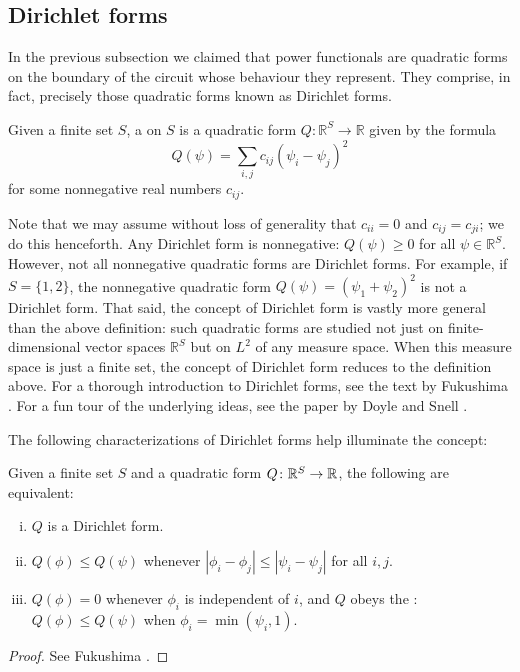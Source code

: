 \subsection{Dirichlet forms}

In the previous subsection we claimed that power functionals are quadratic forms
on the boundary of the circuit whose behaviour they represent. They comprise, in
fact, precisely those quadratic forms known as Dirichlet forms.

\begin{definition}
Given a finite set $S$, a  on $S$ is a quadratic form $Q:
\mathbb{R}^S \to \mathbb{R}$ given by the formula
\[
  Q(\psi) = \sum_{i,j} c_{i j} (\psi_i - \psi_j)^2
\]
for some nonnegative real numbers $c_{i j}$.  
\end{definition}

Note that we may assume without loss of generality that $c_{i i} = 0$ and $c_{i
j} = c_{j i}$; we do this henceforth.  Any Dirichlet form is nonnegative:
$Q(\psi) \ge 0$ for all $\psi \in \mathbb{R}^S$.  However, not all nonnegative
quadratic forms are Dirichlet forms.  For example, if $S = \{1, 2\}$, the
nonnegative quadratic form $Q(\psi) = (\psi_1 + \psi_2)^2$ is not a Dirichlet
form. That said, the concept of Dirichlet form is vastly more general than the
above definition: such quadratic forms are studied not just on
finite-dimensional vector spaces $\mathbb{R}^S$ but on $L^2$ of any measure
space.  When this measure space is just a finite set, the concept of Dirichlet
form reduces to the definition above.  For a thorough introduction to Dirichlet
forms, see the text by Fukushima \cite{Fukushima}.  For a fun tour of the
underlying ideas, see the paper by Doyle and Snell \cite{DS}. 

The following characterizations of Dirichlet forms help illuminate the concept:

\begin{proposition} \label{dirichlet_characterizations}
  Given a finite set $S$ and a quadratic form $Q{\colon} \mathbb{R}^S \to \mathbb{R}$,
  the following are equivalent:
  \begin{enumerate}[(i)]
    \item $Q$ is a Dirichlet form.

    \item $Q(\phi) \le Q(\psi)$ whenever $|\phi_i - \phi_j| \le |\psi_i -
      \psi_j|$ for all $i, j$. 

    \item $Q(\phi) = 0$ whenever $\phi_i$ is independent of $i$, and $Q$ obeys
      the : $Q(\phi) \le Q(\psi)$ when $\phi_i = \min
      (\psi_i, 1) $.
  \end{enumerate}
\end{proposition}
\begin{proof}
See Fukushima \cite{Fukushima}.
\end{proof}

